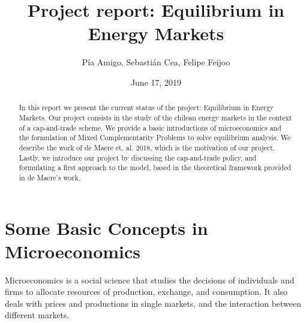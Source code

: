 \documentclass[11pt, letterpaper]{article}
\title{Project report: Equilibrium in Energy Markets}
\author{P\'ia Amigo, Sebasti\'an Cea, Felipe Feijoo}
\date{June 17, 2019}
\begin{document}
\maketitle

\begin{abstract}
In this report we present the current status of the project: Equilibrium in Energy Markets. Our project consists in the study of the chilean energy markets in the context of a cap-and-trade scheme.  We provide a basic introductions of microeconomics and the formulation of Mixed Complementarity Problems to solve equilibrium analysis. We describe the work of de Maere et. al. 2018, which is the motivation of our project. Lastly, we introduce our project by discussing the cap-and-trade policy, and formulating a first approach to the model, based in the theoretical framework provided in de Maere's work. 
\end{abstract}

%

\color{Black}

\section{Some Basic Concepts in Microeconomics}

Microeconomics is a social science that studies the decisions of individuals and firms to allocate resources of production, exchange, and consumption. It also deals with prices and productions in single markets, and the interaction between different markets. 
\end{document}

